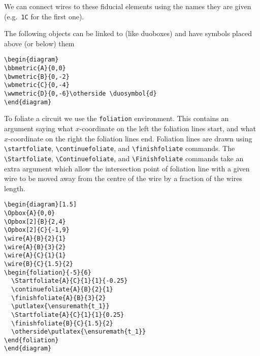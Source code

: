 \documentclass[10pt]{article}
\begin{document}
\noindent We can connect wires to these fiducial elements using the names they are given (e.g.\ \verb+1C+ for the first one).

The following objects can be linked to (like duoboxes) and have symbols placed above (or below) them
\begin{verbatim}
\begin{diagram}
\bbmetric{A}{0,0}
\bwmetric{B}{0,-2}
\wbmetric{C}{0,-4}
\wwmetric{D}{0,-6}\otherside \duosymbol{d}
\end{diagram}
\end{verbatim}


To foliate a circuit we use the \verb+foliation+ environment.  This contains an argument saying what $x$-coordinate on the left the foliation lines start, and what $x$-coordinate on the right the foliation lines end.  Foliation lines are drawn using \verb+\startfoliate+, \verb+\continuefoliate+, and \verb+\finishfoliate+ commands.  The \verb+\Startfoliate+, \verb+\Continuefoliate+, and \verb+\Finishfoliate+ commands take an extra argument which allow the intersection point of foliation line with a given wire to be moved away from the centre of the wire by a fraction of the wires length.
\begin{verbatim}
\begin{diagram}[1.5]
\Opbox{A}{0,0}
\Opbox[2]{B}{2,4}
\Opbox[2]{C}{-1,9}
\wire{A}{B}{2}{1}
\wire{A}{B}{3}{2}
\wire{A}{C}{1}{1}
\wire{B}{C}{1.5}{2}
\begin{foliation}{-5}{6}
  \Startfoliate{A}{C}{1}{1}{-0.25}
  \continuefoliate{A}{B}{2}{1}
  \finishfoliate{A}{B}{3}{2}
  \putlatex{\ensuremath{t_1}}
  \Startfoliate{A}{C}{1}{1}{0.25}
  \finishfoliate{B}{C}{1.5}{2}
  \otherside\putlatex{\ensuremath{t_1}}
\end{foliation}
\end{diagram}
\end{verbatim}
\end{document}
